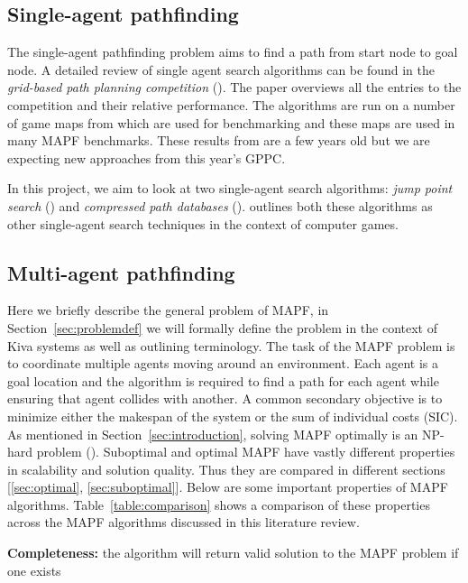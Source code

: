 \documentclass[a4paper,11pt]{article}
\begin{document}
\subsection{Single-agent pathfinding} The single-agent pathfinding problem aims to find a path from start node to goal node. A detailed review of single agent search algorithms can be found in the \textit{grid-based path planning competition} (\cite{sturtevant2015grid}). The paper overviews all the entries to the competition and their relative performance. The algorithms are run on a number of game maps from \cite{sturtevant2012benchmarks} which are used for benchmarking and these maps are used in many MAPF benchmarks. These results from \cite{sturtevant2015grid} are a few years old but we are expecting new approaches from this year's GPPC.

In this project, we aim to look at two single-agent search algorithms: \textit{jump point search} (\cite{harabor2011online}) and \textit{compressed path databases} (\cite{strasser2015compressing}). \cite{botea2013pathfinding} outlines both these algorithms as other single-agent search techniques in the context of computer games.

\subsection{Multi-agent pathfinding} Here we briefly describe the general problem of MAPF, in Section~\ref{sec:problemdef} we will formally define the problem in the context of Kiva systems as well as outlining terminology. The task of the MAPF problem is to coordinate multiple agents moving around an environment. Each agent is a goal location and the algorithm is required to find a path for each agent while ensuring that agent collides with another. A common secondary objective is to minimize either the makespan of the system or the sum of individual costs (SIC). As mentioned in Section~\ref{sec:introduction}, solving MAPF optimally is an NP-hard problem (\cite{yu2013structure}). Suboptimal and optimal MAPF have vastly different properties in scalability and solution quality. Thus they are compared in different sections [\ref{sec:optimal}, \ref{sec:suboptimal}]. Below are some important properties of MAPF algorithms. Table~\ref{table:comparison} shows a comparison of these properties across the MAPF algorithms discussed in this literature review.

\noindent \textbf{Completeness:} the algorithm will return valid solution to the MAPF problem if one exists
\end{document}
